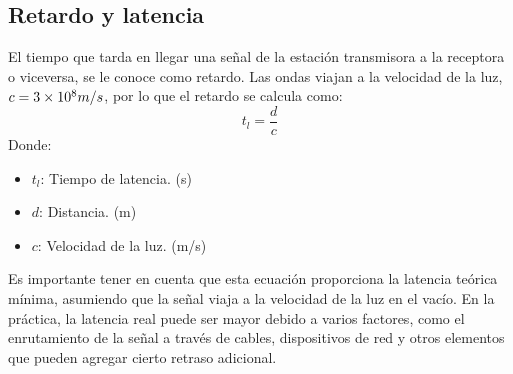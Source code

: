 \documentclass[
	12pt, %
	fleqn, %
	a4paper, %
	oneside, %
]{LegrandOrangeBook}
\begin{document}
\subsection{Retardo y latencia}
El tiempo que tarda en llegar una señal de la estación transmisora a la receptora o viceversa, se le conoce como retardo. Las ondas viajan a la velocidad de la luz, $c=3\times 10^{8} m/s$, por lo que el retardo se calcula como:
\begin{equation}
t_l=\frac{d}{c}
\end{equation}
Donde:
\begin{itemize}
\item $t_l$: Tiempo de latencia. (s)
\item $d$: Distancia. (m)
\item $c$: Velocidad de la luz. (m/s)
\end{itemize}
\begin{remark}
Es importante tener en cuenta que esta ecuación proporciona la latencia teórica mínima, asumiendo que la señal viaja a la velocidad de la luz en el vacío. En la práctica, la latencia real puede ser mayor debido a varios factores, como el enrutamiento de la señal a través de cables, dispositivos de red y otros elementos que pueden agregar cierto retraso adicional.
\end{remark}
\end{document}
